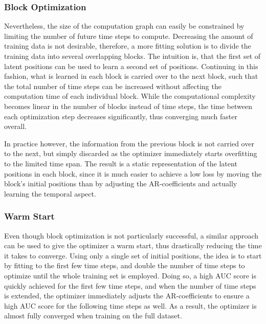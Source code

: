     \subsubsection{Block Optimization}
    
        Nevertheless, the size of the computation graph can easily be constrained by limiting the number of future time steps to compute. Decreasing the amount of training data is not desirable, therefore, a more fitting solution is to divide the training data into several overlapping blocks. 
        The intuition is, that the first set of latent positions can be used to learn a second set of positions. Continuing in this fashion, what is learned in each block is carried over to the next block, such that the total number of time steps can be increased without affecting the computation time of each individual block. 
        While the computational complexity becomes linear in the number of blocks instead of time steps, the time between each optimization step decreases significantly, thus converging much faster overall.
        
        In practice however, the information from the previous block is not carried over to the next, but simply discarded as the optimizer immediately starts overfitting to the limited time span. The result is a static representation of the latent positions in each block, since it is much easier to achieve a low loss by moving the block's initial positions than by adjusting the AR-coefficients and actually learning the temporal aspect.
        
    \subsubsection{Warm Start}
    
        Even though block optimization is not particularly successful, a similar approach can be used to give the optimizer a warm start, thus drastically reducing the time it takes to converge. Using only a single set of initial positions, the idea is to start by fitting to the first few time steps, and double the number of time steps to optimize until the whole training set is employed. Doing so, a high AUC score is quickly achieved for the first few time steps, and when the number of time steps is extended, the optimizer immediately adjusts the AR-coefficients to ensure a high AUC score for the following time steps as well. As a result, the optimizer is almost fully converged when training on the full dataset.
    
